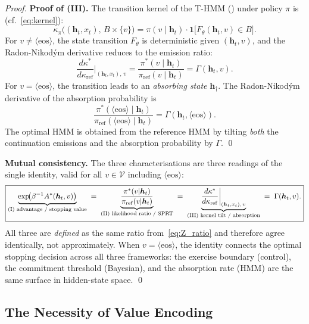 \documentclass[11pt,a4paper]{article}
\theoremstyle{plain}
\theoremstyle{definition}
\theoremstyle{remark}
\newcommand{\vocab}{\mathcal{V}}
\newcommand{\ind}{\mathbf{1}}
\begin{document}
\begin{proof}
\medskip
\noindent\textbf{Proof of (III).}
The transition kernel of the T-HMM () under policy $\pi$
is (cf.~\eqref{eq:kernel}):
\[
  \kappa_\pi\!\bigl((\bm{h}_t, x_t),\, B \times \{v\}\bigr)
  = \pi(v \mid \bm{h}_t) \cdot \ind\!\bigl[F_\theta(\bm{h}_t, v) \in B\bigr].
\]
For $v \neq \langle\mathrm{eos}\rangle$, the state transition $F_\theta$ is
deterministic given $(\bm{h}_t, v)$, and the Radon-Nikod\'ym derivative
reduces to the emission ratio:
\[
  \frac{d\kappa^*}{d\kappa_{\mathrm{ref}}}
  \bigg|_{(\bm{h}_t, x_t),\, v}
  = \frac{\pi^*(v \mid \bm{h}_t)}{\pi_{\mathrm{ref}}(v \mid \bm{h}_t)}
  = \Gamma(\bm{h}_t, v).
\]
For $v = \langle\mathrm{eos}\rangle$, the transition leads to an
\emph{absorbing state} $\bm{h}_\dagger$. The Radon-Nikod\'ym derivative of
the absorption probability is
\[
  \frac{\pi^*(\langle\mathrm{eos}\rangle \mid \bm{h}_t)}%
       {\pi_{\mathrm{ref}}(\langle\mathrm{eos}\rangle \mid \bm{h}_t)}
  = \Gamma(\bm{h}_t, \langle\mathrm{eos}\rangle).
\]
The optimal HMM is obtained from the reference HMM by tilting
\emph{both} the continuation emissions and the absorption probability
by $\Gamma$. \qed

\medskip
\noindent\textbf{Mutual consistency.}
The three characterisations are three readings of the single identity,
valid for all $v \in \vocab$ including $\langle\mathrm{eos}\rangle$:
\begin{equation}\label{eq:master}
  \boxed{%
    \underbrace{\exp\!\bigl(\beta^{-1} A^*(\bm{h}_t, v)\bigr)}_{\text{(I) advantage / stopping value}}
    \;=\;
    \underbrace{\frac{\pi^*(v|\bm{h}_t)}{\pi_{\mathrm{ref}}(v|\bm{h}_t)}}_{\text{(II) likelihood ratio / SPRT}}
    \;=\;
    \underbrace{\frac{d\kappa^*}{d\kappa_{\mathrm{ref}}}
    \bigg|_{(\bm{h}_t, x_t),\, v}}_{\text{(III) kernel tilt / absorption}}
    \;=\;
    \Gamma(\bm{h}_t, v).
  }
\end{equation}
All three are \emph{defined} as the same ratio from~\eqref{eq:Z_ratio}
and therefore agree identically, not approximately. When $v =
\langle\mathrm{eos}\rangle$, the identity connects the optimal stopping
decision across all three frameworks: the exercise boundary (control),
the commitment threshold (Bayesian), and the absorption rate (HMM) are
the same surface in hidden-state space. \qed
\end{proof}

\subsection{The Necessity of Value Encoding}
\end{document}

